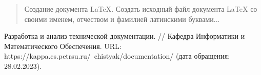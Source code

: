 \maketitle
\begin{abstract}
Создание документа LaTeX. Создать исходный файл документа LaTeX со своими именем, отчеством и фамилией латинскими буквами...
\end{abstract} \hspace{10pt}
\begin{thebibliography}{00}
 Разработка и анализ технической документации. // Кафедра Информатики и Математического Обеспечения. URL: https://kappa.cs.petrsu.ru/~chistyak/documentation/ (дата обращения: 28.02.2023).
\end{thebibliography}
\newpage
\tableofcontents
\clearpage